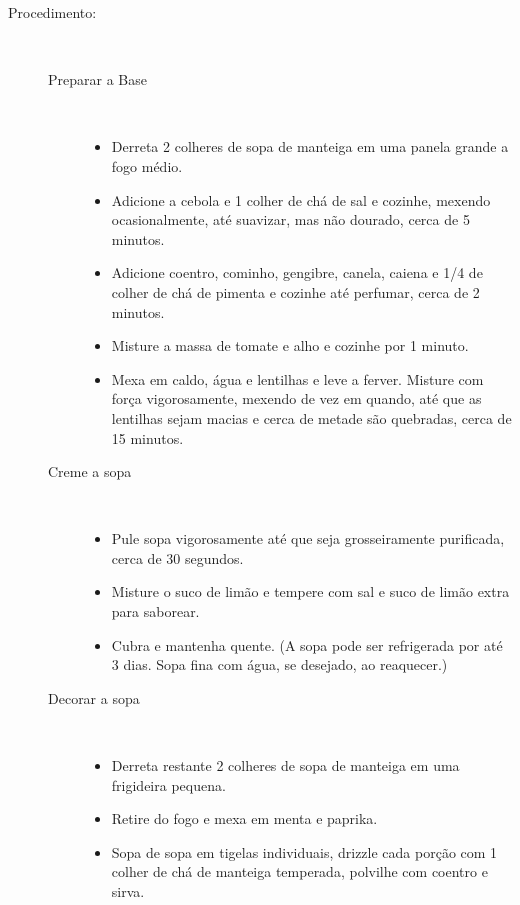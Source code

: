 \documentclass [11pt, letterpaper] {article}
\begin{document}
\begin {description}
\item [Procedimento:] \ \\
\begin {description}
\item [Preparar a Base] \ \\
\begin {itemize}
\item Derreta 2 colheres de sopa de manteiga em uma panela grande a fogo médio.
\item Adicione a cebola e 1 colher de chá de sal e cozinhe, mexendo ocasionalmente, até suavizar, mas não dourado, cerca de 5 minutos.
\item Adicione coentro, cominho, gengibre, canela, caiena e 1/4 de colher de chá de pimenta e cozinhe até perfumar, cerca de 2 minutos.
\item Misture a massa de tomate e alho e cozinhe por 1 minuto.
\item Mexa em caldo, água e lentilhas e leve a ferver. Misture com força vigorosamente, mexendo de vez em quando, até que as lentilhas sejam macias e cerca de metade são quebradas, cerca de 15 minutos.
\end {itemize}
\item [Creme a sopa] \ \\
\begin {itemize}
\item Pule sopa vigorosamente até que seja grosseiramente purificada, cerca de 30 segundos.
\item Misture o suco de limão e tempere com sal e suco de limão extra para saborear.
\item Cubra e mantenha quente. (A sopa pode ser refrigerada por até 3 dias. Sopa fina com água, se desejado, ao reaquecer.)
\end {itemize}
\item [Decorar a sopa] \ \\
\begin {itemize}
\item Derreta restante 2 colheres de sopa de manteiga em uma frigideira pequena.
\item Retire do fogo e mexa em menta e paprika.
\item Sopa de sopa em tigelas individuais, drizzle cada porção com 1 colher de chá de manteiga temperada, polvilhe com coentro e sirva.
\end {itemize}
\end {description}
\end {description}
\end{document}
